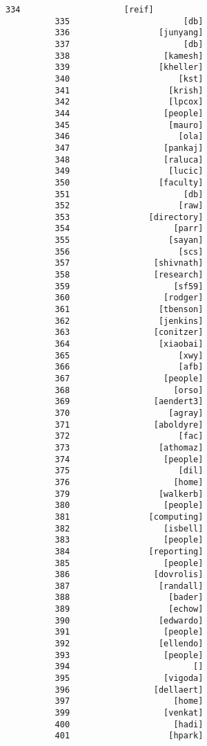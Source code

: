 \documentclass[11pt]{article}
\begin{document}
\begin{Verbatim}[commandchars=\\\{\}]
          334                     [reif]
          335                       [db]
          336                  [junyang]
          337                       [db]
          338                   [kamesh]
          339                  [kheller]
          340                      [kst]
          341                    [krish]
          342                    [lpcox]
          344                   [people]
          345                    [mauro]
          346                      [ola]
          347                   [pankaj]
          348                   [raluca]
          349                    [lucic]
          350                  [faculty]
          351                       [db]
          352                      [raw]
          353                [directory]
          354                     [parr]
          355                    [sayan]
          356                      [scs]
          357                 [shivnath]
          358                 [research]
          359                     [sf59]
          360                   [rodger]
          361                  [tbenson]
          362                  [jenkins]
          363                 [conitzer]
          364                  [xiaobai]
          365                      [xwy]
          366                      [afb]
          367                   [people]
          368                     [orso]
          369                 [aendert3]
          370                    [agray]
          371                 [aboldyre]
          372                      [fac]
          373                  [athomaz]
          374                   [people]
          375                      [dil]
          376                     [home]
          379                  [walkerb]
          380                   [people]
          381                [computing]
          382                   [isbell]
          383                   [people]
          384                [reporting]
          385                   [people]
          386                 [dovrolis]
          387                  [randall]
          388                    [bader]
          389                    [echow]
          390                  [edwardo]
          391                   [people]
          392                  [ellendo]
          393                   [people]
          394                         []
          395                   [vigoda]
          396                 [dellaert]
          397                     [home]
          399                   [venkat]
          400                     [hadi]
          401                    [hpark]

\end{Verbatim}
\end{document}
